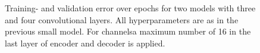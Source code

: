 \begin{center}
	\begin{figure}[H]
		
		\label{Fig:Layer}
		\caption{Training- and validation error over epochs for two models with three and four convolutional layers. All hyperparameters are as in the previous small model. For channelsa  maximum number of 16 in the last layer of encoder and decoder is applied.}
	\end{figure}
\end{center}
